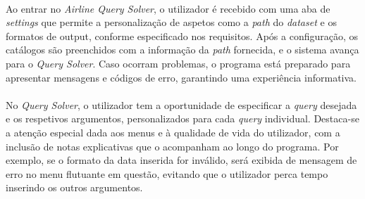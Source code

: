 \documentclass{article}
\begin{document}
\paragraph{}Ao entrar no \textit{Airline Query Solver}, o utilizador é recebido com uma aba de \textit{settings} que permite a personalização de aspetos como a \textit{path} do \textit{dataset} e os formatos de output, conforme especificado nos requisitos. Após a configuração, os catálogos são preenchidos com a informação da \textit{path} fornecida, e o sistema avança para o \textit{Query Solver}. Caso ocorram problemas, o programa está preparado para apresentar mensagens e códigos de erro, garantindo uma experiência informativa.
\vspace{-0.3cm}
\paragraph{}No \textit{Query Solver}, o utilizador tem a oportunidade de especificar a \textit{query} desejada e os respetivos argumentos, personalizados para cada \textit{query} individual. Destaca-se a atenção especial dada aos menus e à qualidade de vida do utilizador, com a inclusão de notas explicativas que o acompanham ao longo do programa. Por exemplo, se o formato da data inserida for inválido, será exibida de mensagem de erro no menu flutuante em questão, evitando que o utilizador perca tempo inserindo os outros argumentos.
\vspace{-0.3cm}
\end{document}
